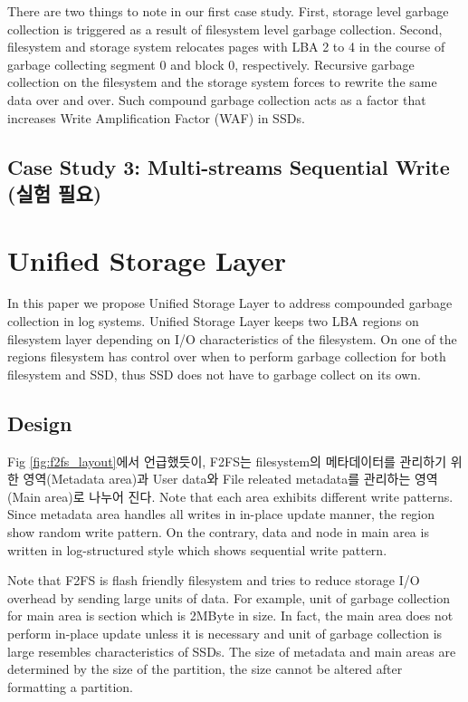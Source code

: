 \documentclass[letterpaper,twocolumn,10pt]{article}
\begin{document}
There are two things to note in our first case study. First, storage level garbage collection is triggered as a result of filesystem level garbage collection. Second, filesystem and storage system relocates pages with LBA 2 to 4 in the course of garbage collecting segment 0 and block 0, respectively. Recursive garbage collection on the filesystem and the storage system forces to rewrite the same data over and over. Such compound garbage collection acts as a factor that increases Write Amplification Factor (WAF) in SSDs.


\subsection{Case Study 3: Multi-streams Sequential Write (실험 필요)}


\section{Unified Storage Layer}
\label{sec:USL}

In this paper we propose Unified Storage Layer to address compounded garbage collection in log systems. Unified Storage Layer keeps two LBA regions on filesystem layer depending on I/O characteristics of the filesystem. On one of the regions filesystem has control over when to perform garbage collection for both filesystem and SSD, thus SSD does not have to garbage collect on its own.


\subsection{Design}

Fig \ref{fig:f2fs_layout}에서 언급했듯이, F2FS는 filesystem의 메타데이터를 관리하기 위한 영역(Metadata area)과 User data와 File releated metadata를 관리하는 영역(Main area)로 나누어 진다. Note that each area exhibits different write patterns. Since metadata area handles all writes in in-place update manner, the region show random write pattern. On the contrary, data and node in main area is written in log-structured style which shows sequential write pattern.

Note that F2FS is flash friendly filesystem and tries to reduce storage I/O overhead by sending large units of data. For example, unit of garbage collection for main area is section which is 2MByte in size. In fact, the main area does not perform in-place update unless it is necessary and unit of garbage collection is large resembles characteristics of SSDs. The size of metadata and main areas are determined by the size of the partition, the size cannot be altered after formatting a partition.
\end{document}
